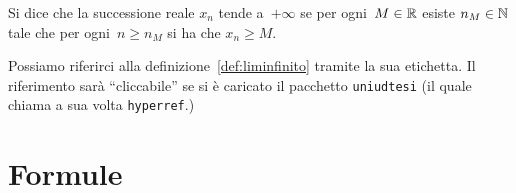 \begin{definizione}\label{def:liminfinito}
Si dice che la successione reale $x_n$ tende a~$+\infty$ se per ogni~$M\in\mathbb{R}$ esiste $n_M\in\mathbb{N}$ tale che per ogni~$n\ge n_M$ si ha che $x_n\ge M$.
\end{definizione}

Possiamo riferirci alla definizione~\ref{def:liminfinito}
tramite la sua etichetta. Il riferimento sar\`{a} ``cliccabile'' se si \`{e} caricato il pacchetto \verb!uniudtesi! (il quale chiama a sua volta \verb!hyperref!.)

\section{Formule}

